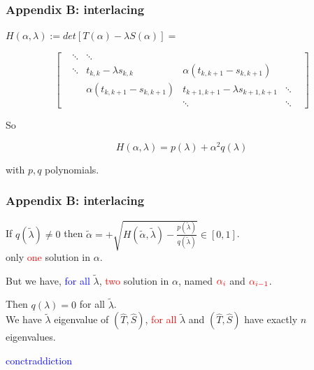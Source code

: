 \documentclass{beamer}
\theoremstyle{definition} \newtheorem{de}{Def}
\theoremstyle{remark} \newtheorem{os}[de]{Remark}
\theoremstyle{plain} \newtheorem{te}[de]{Teo}
\theoremstyle{plain} \newtheorem{co}[de]{Cor}
\theoremstyle{plain} \newtheorem{pr}[de]{Prop}
\theoremstyle{plain} \newtheorem{lem}[de]{Lemm}
\theoremstyle{remark} \newtheorem{rem}[de]{Remark}
\begin{document}
\begin{frame}
  \frametitle{Appendix B: interlacing}

  $H(\alpha,\lambda) := det[T(\alpha)-\lambda S(\alpha)] =$

  \begin{equation*}
    \begin{bmatrix}  
     & \ddots & \ddots & & & \\
      & \ddots & t_{k,k}-\lambda s_{k,k} & \alpha(t_{k,k+1}-s_{k,k+1}) & & \\
      & & \alpha(t_{k,k+1}-s_{k,k+1}) & t_{k+1,k+1}-\lambda s_{k+1,k+1} & \ddots \\
      & & & \ddots & \ddots
    \end{bmatrix}
  \end{equation*}


\pause

 So 

  \begin{equation*}
    H(\alpha,\lambda) = p(\lambda) + \alpha^2 q(\lambda)
  \end{equation*}

  with $p,q$ polynomials.

\end{frame}

\begin{frame}
  \frametitle{Appendix B: interlacing}

  If $q(\tilde\lambda)\ne 0$ then $\tilde\alpha= + \sqrt{H(\tilde\alpha,\tilde\lambda)-\frac{p(\tilde\lambda)}{q(\tilde\lambda)}}\in[0,1]$.\\
  only \textcolor{red}{one} solution in $\alpha$.

  \pause

  But we have, \textcolor{blue}{for all} $\tilde\lambda$, \textcolor{red}{two} solution in $\alpha$, named $\textcolor{red}{\alpha_i}$ and $\textcolor{red}{\alpha_{i-1}}$. 

  \pause

  Then $q(\lambda)=0$ for all $\tilde\lambda$. \\
  We have $\tilde\lambda$ eigenvalue of $(\hat T, \hat S)$, \textcolor{red}{for all} $\tilde\lambda$ and $(\hat T, \hat S)$ have exactly $n$ eigenvalues.

  \pause

  \textcolor{blue}{conctraddiction}
 

  \hyperlink{BeforeInterlacing}{}

\end{frame}
\end{document}
